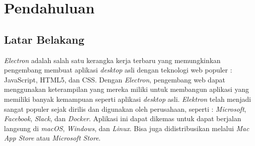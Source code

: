 \chapter{Pendahuluan}
\label{chap:intro}
   
\section{Latar Belakang}
\label{sec:label}

\begin{comment}
Dibutuhkan waktu yang lama bagi para pengembang web yang ingin membuat aplikasi \textit{desktop}, dimana mereka perlu mempelajari bahasa baru bersamaan dengan kerangka kerjanya. Hal ini tentunya akan menjadi penghalang bagi mereka yang mau mengembangkan aplikasi desktop. Maka dari itu, saat ini terdapat sebuah kerangka kerja yang tersedia bagi pengembang web untuk membuat aplikasi \textit{desktop} lintas \textit{platform}. 
\end{comment}


\textit{Electron} adalah salah satu kerangka kerja terbaru yang memungkinkan pengembang membuat aplikasi \textit{desktop} asli dengan teknologi web populer : JavaScript, HTML5, dan CSS. Dengan \textit{Electron}, pengembang web dapat menggunakan keterampilan yang mereka miliki untuk membangun aplikasi yang memiliki banyak kemampuan seperti aplikasi \textit{desktop} asli. \textit{Elektron} telah menjadi sangat populer sejak dirilis dan digunakan oleh perusahaan, seperti : \textit{Microsoft}, \textit{Facebook}, \textit{Slack}, dan \textit{Docker}. Aplikasi ini dapat dikemas untuk dapat berjalan langsung di \textit{macOS}, \textit{Windows}, dan \textit{Linux}. Bisa juga didistribusikan melalui \textit{Mac App Store} atau \textit{Microsoft Store}.

\begin{comment}
Dalam pembuatan sebuah aplikasi \textit{desktop}, tentunya kita memerlukan \textit{library} untuk membantu kita dalam membuat aplikasi tersebut. Terdapat banyak \textit{library} visualisasi yang tersedia, contohnya : \textit{Vega}, \textit{D3}, dan \textit{Vis.js}. Namun untuk \textit{library} visualisasi \textit{Vega} dan \textit{D3} terlalu \textit{powerful} untuk menangani proyek visualisasi kurikulum dalam bentuk \textit{tree} dan \textit{timeline}. Library visualisasi \textit{Vis.js} sudah sangat memadai untuk menangani proyek tersebut.
\end{comment}

